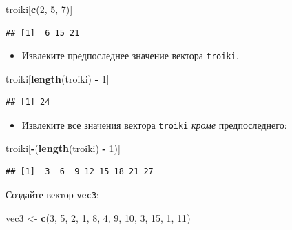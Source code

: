 \documentclass[]{book}
\newenvironment{Shaded}{\begin{snugshade}}{\end{snugshade}}
\newcommand{\KeywordTok}[1]{\textcolor[rgb]{0.13,0.29,0.53}{\textbf{#1}}}
\newcommand{\DecValTok}[1]{\textcolor[rgb]{0.00,0.00,0.81}{#1}}
\newcommand{\StringTok}[1]{\textcolor[rgb]{0.31,0.60,0.02}{#1}}
\newcommand{\OperatorTok}[1]{\textcolor[rgb]{0.81,0.36,0.00}{\textbf{#1}}}
\newcommand{\NormalTok}[1]{#1}
\providecommand{\tightlist}{%
  \setlength{\itemsep}{0pt}\setlength{\parskip}{0pt}}
\begin{document}
\begin{Shaded}
\begin{Highlighting}[]
\NormalTok{troiki[}\KeywordTok{c}\NormalTok{(}\DecValTok{2}\NormalTok{, }\DecValTok{5}\NormalTok{, }\DecValTok{7}\NormalTok{)]}
\end{Highlighting}
\end{Shaded}

\begin{verbatim}
## [1]  6 15 21
\end{verbatim}

\begin{itemize}
\tightlist
\item
  Извлеките предпоследнее значение вектора \texttt{troiki}.
\end{itemize}

\begin{Shaded}
\begin{Highlighting}[]
\NormalTok{troiki[}\KeywordTok{length}\NormalTok{(troiki) }\OperatorTok{-}\StringTok{ }\DecValTok{1}\NormalTok{]}
\end{Highlighting}
\end{Shaded}

\begin{verbatim}
## [1] 24
\end{verbatim}

\begin{itemize}
\tightlist
\item
  Извлеките все значения вектора \texttt{troiki} \emph{кроме}
  предпоследнего:
\end{itemize}

\begin{Shaded}
\begin{Highlighting}[]
\NormalTok{troiki[}\OperatorTok{-}\NormalTok{(}\KeywordTok{length}\NormalTok{(troiki) }\OperatorTok{-}\StringTok{ }\DecValTok{1}\NormalTok{)]}
\end{Highlighting}
\end{Shaded}

\begin{verbatim}
## [1]  3  6  9 12 15 18 21 27
\end{verbatim}

Создайте вектор \texttt{vec3}:

\begin{Shaded}
\begin{Highlighting}[]
\NormalTok{vec3 <-}\StringTok{ }\KeywordTok{c}\NormalTok{(}\DecValTok{3}\NormalTok{, }\DecValTok{5}\NormalTok{, }\DecValTok{2}\NormalTok{, }\DecValTok{1}\NormalTok{, }\DecValTok{8}\NormalTok{, }\DecValTok{4}\NormalTok{, }\DecValTok{9}\NormalTok{, }\DecValTok{10}\NormalTok{, }\DecValTok{3}\NormalTok{, }\DecValTok{15}\NormalTok{, }\DecValTok{1}\NormalTok{, }\DecValTok{11}\NormalTok{)}
\end{Highlighting}
\end{Shaded}
\end{document}
